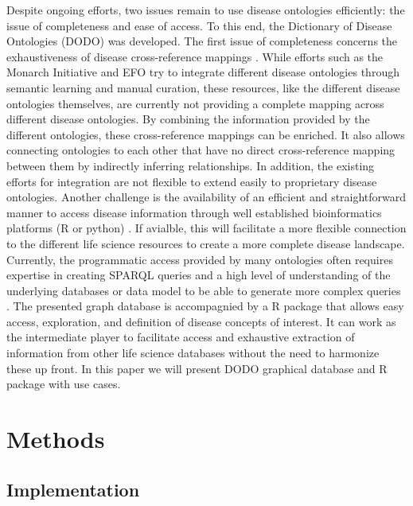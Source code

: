 \documentclass[9pt,a4paper,]{extarticle}
\begin{document}
Despite ongoing efforts, two issues remain to use disease ontologies efficiently: the issue of completeness and ease of access. To this end, the Dictionary of Disease Ontologies (DODO) was developed. The first issue of completeness concerns the exhaustiveness of disease cross-reference mappings \citep{Hu2017, Rappaport2013}. While efforts such as the Monarch Initiative and EFO try to integrate different disease ontologies through semantic learning and manual curation, these resources, like the different disease ontologies themselves, are currently not providing a complete mapping across different disease ontologies. By combining the information provided by the different ontologies, these cross-reference mappings can be enriched. It also allows connecting ontologies to each other that have no direct cross-reference mapping between them by indirectly inferring relationships. In addition, the existing efforts for integration are not flexible to extend easily to proprietary disease ontologies. Another challenge is the availability of an efficient and straightforward manner to access disease information through well established bioinformatics platforms (R or python) \citep{Rappaport2013, Saqi2018}. If avialble, this will facilitate a more flexible connection to the different life science resources to create a more complete disease landscape. Currently, the programmatic access provided by many ontologies often requires expertise in creating SPARQL queries and a high level of understanding of the underlying databases or data model to be able to generate more complex queries \citep{Hasnain2014, Hu2017, Rappaport2013}. The presented graph database is accompagnied by a R package that allows easy access, exploration, and definition of disease concepts of interest. It can work as the intermediate player to facilitate access and exhaustive extraction of information from other life science databases without the need to harmonize these up front. In this paper we will present DODO graphical database and R package with use cases.

\hypertarget{methods}{%
\section{Methods}\label{methods}}

\hypertarget{implementation}{%
\subsection{Implementation}\label{implementation}}
\end{document}
